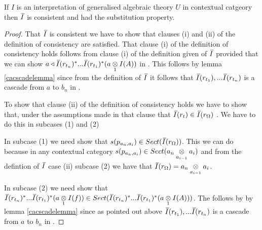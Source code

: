 \begin{oldtt}
\begin{lemma}
If $I$ is an interpretation of generalised algebraic theory $U$ in contextual catgeory \catcw
then $\Ibar$ is consistent and had the substitution property.
\end{lemma}
\begin{proof}


That $\Ibar$ is consistent we have to show that clauses (i) and (ii) of the definition of consistency are satisfied.
That clause (i) of the definition of consistency holds follows  from clause (i) of the definition given of $\Ibar$ provided that
we can show $a \base \Ibar(r_{t_n})^*...\Ibar(r_{t_1})^*(\crossx{a}{I(A)}{1})$ in \catc. 
This follows by lemma \ref{cacscadelemma} since from the definition of $\Ibar$ it follows that $\Ibar(r_{t_1}),...\Ibar(r_{t_n})$
is a cascade from $a$ to $b_n$ in \catc. 

To show that clause (ii) of the definition of consistency holds we have to show that, under the assumptions made in that clause 
that $\Ibar(r_t) \in \Ibar(r_\Omega)$ . We have to do this in subcases (1) and (2)

In subcase (1) we need show that
$s(p_{a_n,a_i}) \in Sect(\Ibar(r_\Omega))$. This we can do because in any contextual category $s(p_{a_n,a_i}) \in Sect(\crossx{a_n}{a_i}{a_{i-1}})$
and from the defintion of $\Ibar$ case (ii) subcase (2) we have that $\Ibar(r_\Omega)=\crossx{a_n}{a_i}{a_{i-1}}$. 


In subcase (2) we need show that
$\Ibar(r_{t_n})^*...\Ibar(r_{t_1})^*(\crossx{a}{I(f)}{1}) \in Sect(\Ibar(r_{t_n})^*...\Ibar(r_{t_1})^*(\crossx{a}{I(A)}{1}))$.
The follows by by lemma \ref{cacscadelemma} since as pointed out above $\Ibar(r_{t_1}),...\Ibar(r_{t_n})$
is a cascade from $a$ to $b_n$ in \catc. 





\iffalse
[(iv)] if, in addition, $r_s$ is the rule \srule and is  derived rule of $U$ that is mapped by $I$
to a section $g$ of \catcw
then the rule \srulesubstituted[,] which is a derived rule of $U$ by virtue of the substitution lemma, is mapped by $I$ 
to the section $\fmstar...\fonestar (\crossx{a}{g}{1})$ of \catcw
\fi
\mbox{}\hfill {}
\end{proof}
\end{oldtt}